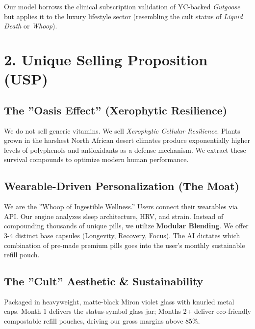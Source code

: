 \documentclass[11pt,a4paper]{article}
\begin{document}
Our model borrows the clinical subscription validation of YC-backed \textit{Gutgoose} but applies it to the luxury lifestyle sector (resembling the cult status of \textit{Liquid Death} or \textit{Whoop}).

\section{2. Unique Selling Proposition (USP)}

\subsection{The ''Oasis Effect'' (Xerophytic Resilience)}
We do not sell generic vitamins. We sell \textit{Xerophytic Cellular Resilience}. Plants grown in the harshest North African desert climates produce exponentially higher levels of polyphenols and antioxidants as a defense mechanism. We extract these survival compounds to optimize modern human performance.

\subsection{Wearable-Driven Personalization (The Moat)}
We are the ''Whoop of Ingestible Wellness.'' Users connect their wearables via API. Our engine analyzes sleep architecture, HRV, and strain. Instead of compounding thousands of unique pills, we utilize \textbf{Modular Blending}. We offer 3-4 distinct base capsules (Longevity, Recovery, Focus). The AI dictates which combination of pre-made premium pills goes into the user's monthly sustainable refill pouch. 

\subsection{The ''Cult'' Aesthetic \& Sustainability}
Packaged in heavyweight, matte-black Miron violet glass with knurled metal caps. Month 1 delivers the status-symbol glass jar; Months 2+ deliver eco-friendly compostable refill pouches, driving our gross margins above 85\%.

\end{document}
